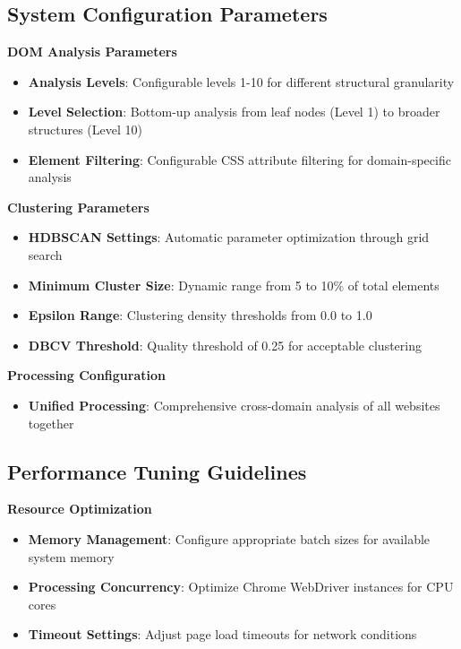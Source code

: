 \subsection{System Configuration Parameters}
\label{subsec:system-configuration}

\textbf{DOM Analysis Parameters}
\begin{itemize}
    \item \textbf{Analysis Levels}: Configurable levels 1-10 for different structural granularity
    \item \textbf{Level Selection}: Bottom-up analysis from leaf nodes (Level 1) to broader structures (Level 10)
    \item \textbf{Element Filtering}: Configurable CSS attribute filtering for domain-specific analysis
\end{itemize}

\textbf{Clustering Parameters}
\begin{itemize}
    \item \textbf{HDBSCAN Settings}: Automatic parameter optimization through grid search
    \item \textbf{Minimum Cluster Size}: Dynamic range from 5 to 10\% of total elements
    \item \textbf{Epsilon Range}: Clustering density thresholds from 0.0 to 1.0
    \item \textbf{DBCV Threshold}: Quality threshold of 0.25 for acceptable clustering
\end{itemize}

\textbf{Processing Configuration}
\begin{itemize}
    \item \textbf{Unified Processing}: Comprehensive cross-domain analysis of all websites together
\end{itemize}

\subsection{Performance Tuning Guidelines}
\label{subsec:performance-tuning}

\textbf{Resource Optimization}
\begin{itemize}
    \item \textbf{Memory Management}: Configure appropriate batch sizes for available system memory
    \item \textbf{Processing Concurrency}: Optimize Chrome WebDriver instances for CPU cores
    \item \textbf{Timeout Settings}: Adjust page load timeouts for network conditions
\end{itemize}

